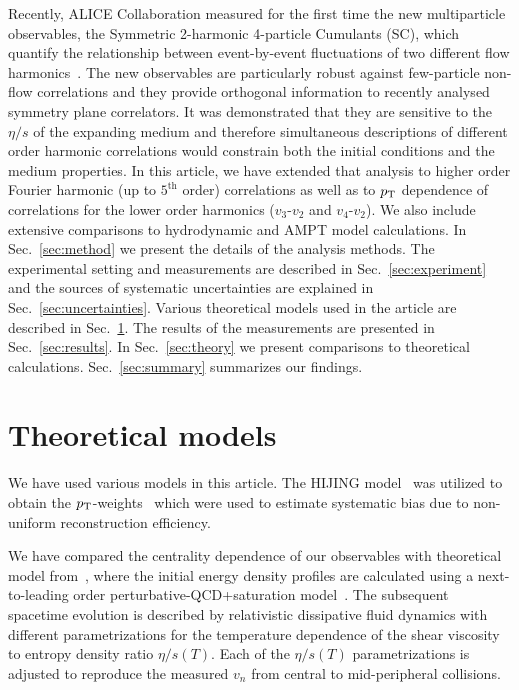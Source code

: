 \documentclass[ALICE,manyauthors]{cernphprep}
\begin{document}
Recently, ALICE Collaboration measured for the first time the new multiparticle observables, the Symmetric 2-harmonic 4-particle Cumulants (SC), which quantify the relationship between event-by-event fluctuations of two different flow harmonics~\cite{ALICE:2016kpq}. The new observables are particularly robust against few-particle non-flow correlations and they provide orthogonal information to recently analysed symmetry plane correlators. 
It was demonstrated that they are sensitive to the $\eta/s$ of the expanding medium and therefore simultaneous descriptions of different order harmonic correlations would constrain 
both the initial conditions and the medium properties.
In this article, we have extended that analysis to higher order Fourier harmonic (up to $5^{\mathrm{th}}$ order) correlations as well as to $p_{\rm T}$ dependence of correlations for the lower order harmonics ($v_3$-$v_2$ and $v_4$-$v_2$).  We also include extensive comparisons to hydrodynamic and AMPT model calculations.
In Sec.~\ref{sec:method} we present the details of the analysis methods. The experimental setting and measurements are described in Sec.~\ref{sec:experiment} and the sources of systematic uncertainties are explained in Sec.~\ref{sec:uncertainties}. Various theoretical models used in the article are described in Sec.~\ref{sec:models}. The results of the measurements are presented in Sec.~\ref{sec:results}.
 In Sec.~\ref{sec:theory} we present comparisons to theoretical calculations. Sec.~\ref{sec:summary} summarizes our findings.
 
 
%




\section{Theoretical models}
\label{sec:models}
We have used various models in this article. The {HIJING} model~\cite{Wang:1991hta,Gyulassy:1994ew} was utilized to obtain the $p_{\rm T}$-weights~\cite{Bilandzic:2013kga} which were used to estimate systematic bias due to non-uniform reconstruction efficiency. 

We have compared the centrality dependence of our observables with theoretical model from~\cite{Niemi:2015qia}, where the initial energy density profiles are calculated using a next-to-leading order perturbative-QCD+saturation model~\cite{Paatelainen:2012at,Paatelainen:2013eea}. The subsequent spacetime evolution is described by relativistic dissipative fluid dynamics with different parametrizations for the temperature dependence of the shear viscosity to entropy density ratio $\eta/s(T)$. Each of the $\eta/s(T)$ parametrizations is adjusted to reproduce the measured $v_n$ from central to mid-peripheral collisions. 
\end{document}
